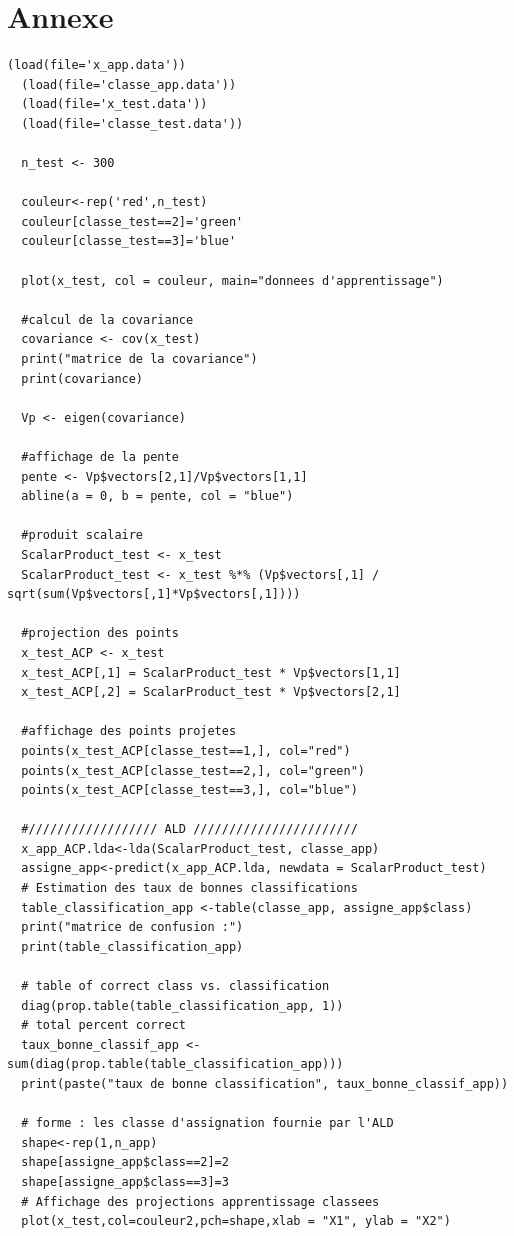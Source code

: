 \documentclass[a4paper,11pt]{article}
\begin{document}
  \section{Annexe}
  \begin{lstlisting}[caption=Macro de l'analyse en composante principale]
  (load(file='x_app.data'))
  (load(file='classe_app.data'))
  (load(file='x_test.data'))
  (load(file='classe_test.data'))

  n_test <- 300

  couleur<-rep('red',n_test)
  couleur[classe_test==2]='green'
  couleur[classe_test==3]='blue'

  plot(x_test, col = couleur, main="donnees d'apprentissage")

  #calcul de la covariance
  covariance <- cov(x_test)
  print("matrice de la covariance")
  print(covariance)

  Vp <- eigen(covariance)

  #affichage de la pente
  pente <- Vp$vectors[2,1]/Vp$vectors[1,1]
  abline(a = 0, b = pente, col = "blue")

  #produit scalaire
  ScalarProduct_test <- x_test
  ScalarProduct_test <- x_test %*% (Vp$vectors[,1] / sqrt(sum(Vp$vectors[,1]*Vp$vectors[,1])))

  #projection des points
  x_test_ACP <- x_test
  x_test_ACP[,1] = ScalarProduct_test * Vp$vectors[1,1]
  x_test_ACP[,2] = ScalarProduct_test * Vp$vectors[2,1]

  #affichage des points projetes
  points(x_test_ACP[classe_test==1,], col="red")
  points(x_test_ACP[classe_test==2,], col="green")
  points(x_test_ACP[classe_test==3,], col="blue")

  #////////////////// ALD ///////////////////////
  x_app_ACP.lda<-lda(ScalarProduct_test, classe_app)
  assigne_app<-predict(x_app_ACP.lda, newdata = ScalarProduct_test)
  # Estimation des taux de bonnes classifications
  table_classification_app <-table(classe_app, assigne_app$class)
  print("matrice de confusion :")
  print(table_classification_app)

  # table of correct class vs. classification
  diag(prop.table(table_classification_app, 1))
  # total percent correct
  taux_bonne_classif_app <-sum(diag(prop.table(table_classification_app)))
  print(paste("taux de bonne classification", taux_bonne_classif_app))

  # forme : les classe d'assignation fournie par l'ALD
  shape<-rep(1,n_app)
  shape[assigne_app$class==2]=2
  shape[assigne_app$class==3]=3
  # Affichage des projections apprentissage classees
  plot(x_test,col=couleur2,pch=shape,xlab = "X1", ylab = "X2")

  \end{lstlisting}
  
\end{document}
